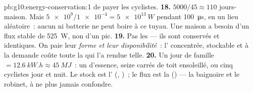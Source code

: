 \begin{solution}{pb:g10:energy-conservation:1}
de payer les cyclistes.
\textbf{18.} $5000/45 \approx 110$ jours-maison. Mais
$\num{5e9}/\num{1e-4} = \qty{5e13}{W}$ pendant \qty{100}{\micro s}, en
un lieu aléatoire~: aucun  ni batterie ne
peut boire à ce tuyau. Une maison a besoin d'un flux stable de
\qty{525}{W}, non d'un pic.
\textbf{19.} Pas les  --- ils sont conservés et
identiques. On paie leur \emph{forme et leur disponibilité}~:
l' concentrée, stockable et à la demande coûte
toute la  qui l'a rendue telle.
\textbf{20.} Un jour de famille $= \qty{12.6}{kW.h} \approx
\qty{45}{MJ}$~: un  d'essence, seize
 carrés de toit ensoleillé, ou cinq cyclistes
jour et nuit. Le stock est l'
(, )~; le flux est
la  () --- la baignoire et le
robinet, à ne plus jamais confondre.
\end{solution}
